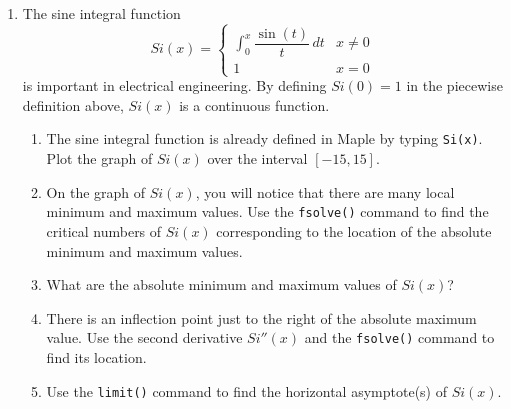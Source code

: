 \begin{enumerate}
    \item The sine integral function
    \[Si(x) = \begin{cases} \displaystyle\int_{0}^x \dfrac{\sin(t)}{t}\, dt & x \neq 0 \\ 1 & x = 0 \end{cases}\]
    is important in electrical engineering. By defining $Si(0)=1$ in the piecewise definition above, $Si(x)$ is a continuous function.
    \begin{enumerate}
        \item The sine integral function is already defined in Maple by typing \texttt{Si(x)}. Plot the graph of $Si(x)$ over the interval $[-15,15]$.
        \item On the graph of $Si(x)$, you will notice that there are many local minimum and maximum values. Use the \texttt{fsolve()} command to find the critical numbers of $Si(x)$ corresponding to the location of the absolute minimum and maximum values.
        \item What are the absolute minimum and maximum values of $Si(x)$?
        \vspace{-.5cm}
        \item There is an inflection point just to the right of the absolute maximum value. Use the second derivative $Si''(x)$ and the \texttt{fsolve()} command to find its location.
        \item Use the \texttt{limit()} command to find the horizontal asymptote(s) of $Si(x)$.

\end{enumerate}
\end{enumerate}
